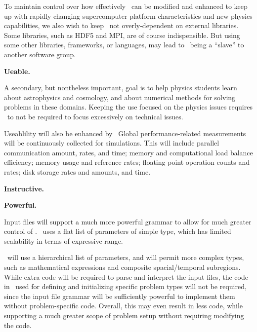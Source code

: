 \documentclass[11pt]{article}
\begin{document}
    To maintain control over how effectively \cello\ can be modified
    and enhanced to keep up with rapidly changing supercomputer
    platform characteristics and new physics capabilities, we also
    wish to keep \cello\ not overly-dependent on external libraries.
    Some libraries, such as HDF5 and MPI, are of course indispensible.
    But using some other libraries, frameworks, or languages, may lead to 
    \cello\ being a ``slave'' to another software group.



    \textbf{Ueable.}

    A secondary, but nontheless important, goal is to help
    physics students learn about astrophysics and cosmology, and
    about numerical methods for solving problems in these
    domains.  Keeping the use focused on the physics issues requires
    \cello\ to not be required to focus excessively on technical
    issues.

    Useablility will also be enhanced by \cello\
    Global performance-related measurements will be continuously
    collected for simulations.  This will include parallel
    communication amount, rates, and time; memory and computational
    load balance efficiency; memory usage and reference rates;
    floating point operation counts and rates; disk storage rates and
    amounts, and time.

    \textbf{Instructive.}  


    \textbf{Powerful.}

    Input files will support a much more powerful grammar to allow for
    much greater control of \cello.  \enzo\ uses a flat list of
    parameters of simple type, which has limited scalability in terms
    of expressive range.

    \cello\ will use a hierarchical list of parameters, and will
    permit more complex types, such as mathematical expressions and
    composite spacial/temporal subregions.  While extra code will be
    required to parse and interpret the input files, the code in
    \enzo\ used for defining and initializing specific problem types
    will not be required, since the input file grammar will be
    sufficiently powerful to implement them without problem-specific
    code.  Overall, this may even result in less code, while
    supporting a much greater scope of problem setup without requiring
    modifying the code.
    
\end{document}

